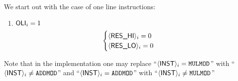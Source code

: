 We start out with the case of one line instructions:
\begin{enumerate}
	\item \If $\oli_{i} = 1$ \Then
	\[
	\begin{cases}
		\iResHi_{i} = 0 \\
		\iResLo_{i} = 0 \\
	\end{cases}
	\]
	\iffalse
	\item \If \Big($\oli_{i} = 1$ \et $\bit{3}_{i} = 1$\Big) ~ \Then
	\[
	\begin{cases}
		\iResHi_{i} = 0 \\
		\iResLo_{i} = 0 \\
	\end{cases}
	\]
	\item \If \Big($\oli_{i} = 1$ \et $\bit{3}_{i} = 0$\Big) \Then
	\[
	\begin{cases}
		\iResHi_{i} = 0 \\
		\iResLo_{i} = 0 \\
	\end{cases}
	\]
	\begin{enumerate}
		\item \If $\iInst_{i} = \inst{MULMOD}$
		\[
		\begin{cases}
			\iResHi_{i} = 0 \\
			\iResLo_{i} = 0 \\
		\end{cases}
		\]
	\end{enumerate}
	\item \If \Big($\oli_{i} = 1$ \et $\iInst_{i} \neq \inst{MULMOD}$\Big) ~ \Then
	\begin{enumerate}
		\item \If $\bit{1}_{i} = 1$ \Then
		\[
		\begin{cases}
			\iResHi_{i} = \iArgTwoHi_{i} \\
			\iResLo_{i} = \iArgTwoLo_{i} \\
		\end{cases}
		\]
		\item \If $\bit{1}_{i} = 0$ \Then
		\[
		\begin{cases}
			\iResHi_{i} = \iArgOneHi_{i} \\
			\iResLo_{i} = \iArgOneLo_{i} \\
		\end{cases}
		\]
	\end{enumerate}
	\fi
\end{enumerate}
Note that in the implementation one may replace
``\If $\iInst_{i} = \inst{MULMOD}$'' with ``\If $\langle{}\textsf{INST}\rangle{}_{i} \neq \texttt{ADDMOD}$'' and
``\If $\langle{}\textsf{INST}\rangle{}_{i} = \texttt{ADDMOD}$'' with ``\If $\iInst_{i} \neq \inst{MULMOD}$''